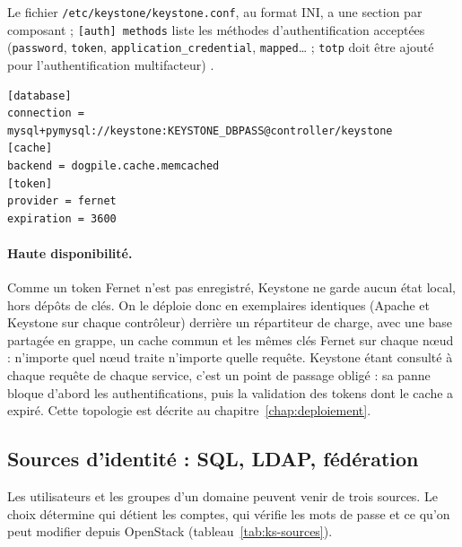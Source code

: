 Le fichier \texttt{/etc/keystone/keystone.conf}, au format INI, a une section par composant ; \texttt{[auth] methods} liste les méthodes
d'authentification acceptées (\texttt{password}, \texttt{token}, \texttt{application\_credential}, \texttt{mapped}\dots{} ;
\texttt{totp} doit être ajouté pour l'authentification multifacteur) \parencite{keystone-options}.

\par\noindent\begin{minipage}{\linewidth}
\begin{lstlisting}
[database]
connection = mysql+pymysql://keystone:KEYSTONE_DBPASS@controller/keystone
[cache]
backend = dogpile.cache.memcached
[token]
provider = fernet
expiration = 3600
\end{lstlisting}
\end{minipage}\par

\paragraph{Haute disponibilité.} Comme un token Fernet n'est pas enregistré, Keystone ne garde aucun état local, hors dépôts de
clés. On le déploie donc en exemplaires identiques (Apache et Keystone sur chaque contrôleur) derrière un répartiteur de charge, avec une
base partagée en grappe, un cache commun et les mêmes clés Fernet sur chaque nœud : n'importe quel nœud traite n'importe quelle
requête. Keystone étant consulté à chaque requête de chaque service, c'est un point de passage obligé : sa panne bloque d'abord les
authentifications, puis la validation des tokens dont le cache a expiré. Cette topologie est décrite au
chapitre~\ref{chap:deploiement}.


\subsection{Sources d'identité : SQL, LDAP, fédération}\label{sec:ks-backends}

Les utilisateurs et les groupes d'un domaine peuvent venir de trois sources. Le choix détermine qui
détient les comptes, qui vérifie les mots de passe et ce qu'on peut modifier depuis OpenStack
(tableau~\ref{tab:ks-sources}).

